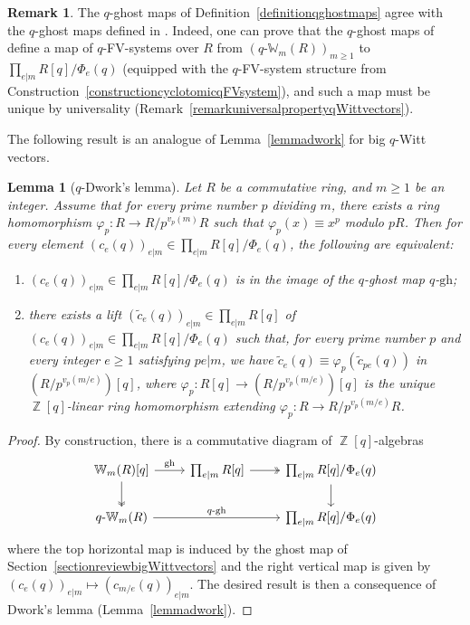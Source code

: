 \documentclass[10pt,twoside]{scrarticle}
\newlength{\mar} \setlength{\mar}{1cm}%
\newlength{\len}
\newtheorem{lemma}[theorem]{Lemma}
\theoremstyle{definition}
\newtheorem{remark}[theorem]{Remark}
\DeclareMathOperator{\Z}{\mathbb{Z}}
\newcommand{\W}{\mathbb{W}}
\newcommand{\qWm}{q\text{-}\mathbb{W}_m}
\newcommand{\gh}{\mathrm{gh}}
\renewcommand{\ge}{\geqslant}
\numberwithin{equation}{theorem}
\begin{document}
\begin{remark}
    The $q$-ghost maps of Definition~\ref{definitionqghostmaps} agree with the $q$-ghost maps defined in \cite[2.13]{wagner_q-witt_2024}. Indeed, one can prove that the $q$-ghost maps of \cite[2.13]{wagner_q-witt_2024} define a map of $q$-FV-systems over $R$ from $(\qWm(R))_{m \ge 1}$ to $\prod_{e|m} R[q]/\Phi_e(q)$ (equipped with the $q$-FV-system structure from Construction~\ref{constructioncyclotomicqFVsystem}), and such a map must be unique by universality (Remark~\ref{remarkuniversalpropertyqWittvectors}). 
\end{remark}

The following result is an analogue of Lemma~\ref{lemmadwork} for big $q$-Witt vectors.

\begin{lemma}[$q$-Dwork's lemma]\label{lemmaqDwork}
    Let $R$ be a commutative ring, and $m \ge 1$ be an integer. Assume that for every prime number $p$ dividing $m$, there exists a ring homomorphism $\varphi_p : R \rightarrow R/p^{v_p(m)}R$ such that $\varphi_p(x) \equiv x^p$ modulo $pR$. Then for every element $(c_e(q))_{e|m} \in \prod_{e|m} R[q]/\Phi_e(q)$, the following are equivalent:
    \begin{enumerate}
        \item $(c_e(q))_{e|m} \in \prod_{e|m} R[q]/\Phi_e(q)$ is in the image of the $q$-ghost map $q$-$\gh$;
        \item there exists a lift $(\tilde{c}_e(q))_{e|m} \in \prod_{e|m} R[q]$ of $(c_e(q))_{e|m} \in \prod_{e|m} R[q]/\Phi_e(q)$ such that, for every prime number $p$ and every integer $e \ge 1$ satisfying $pe|m$, we have $\tilde{c}_e(q) \equiv \varphi_p(\tilde{c}_{pe}(q))$ in $(R/p^{v_p(m/e)})[q]$, where $\varphi_p : R[q] \rightarrow (R/p^{v_p(m/e)})[q]$ is the unique $\Z[q]$-linear ring homomorphism extending $\varphi_p : R \rightarrow R/p^{v_p(m/e)}R$.
    \end{enumerate}
\end{lemma}

\begin{proof}
    By construction, there is a commutative diagram of $\Z[q]$-algebras
    $$\begin{tikzcd}
        \W_m(R)[q] \ar[r,"\text{gh}"] \ar[d,two heads] & \prod_{e|m} R[q] \ar[r,two heads] & \prod_{e|m} R[q] / \Phi_e(q) \ar[d] \\
        \qWm(R) \arrow[rr,"q\text{-gh}"] & & \prod_{e|m} R[q]/\Phi_e(q)
    \end{tikzcd}$$
    where the top horizontal map is induced by the ghost map of Section~\ref{sectionreviewbigWittvectors} and the right vertical map is given by $(c_e(q))_{e|m} \mapsto (c_{m/e}(q))_{e|m}$. The desired result is then a consequence of Dwork's lemma (Lemma~\ref{lemmadwork}).
\end{proof}
\end{document}
